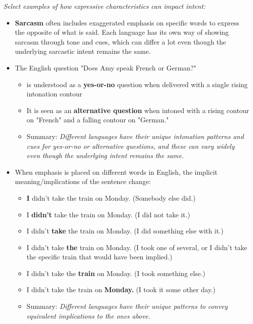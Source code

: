 \begin{boxA}
\textit{Select examples of how expressive characteristics can impact intent:}
\begin{itemize}
    \item \textbf{Sarcasm} often includes exaggerated emphasis on specific words to express the opposite of what is said. Each language has its own way of showing sarcasm through tone and cues, which can differ a lot even though the underlying sarcastic intent remains the same.
    \item The English question "Does Amy speak French or German?"
    \begin{itemize}
        \item is understood as a \textbf{yes-or-no} question when delivered with a single rising intonation contour
        \item It is seen as an \textbf{alternative question} when intoned with a rising contour on "French" and a falling contour on "German."
        \item Summary: \textit{Different languages have their unique intonation patterns and cues for yes-or-no or alternative questions, and these can vary widely even though the underlying intent remains the same.}
    \end{itemize}
    \item When emphasis is placed on different words in English, the implicit meaning/implications of the sentence change:
    \begin{itemize}
        \item \textbf{I} didn't take the train on Monday. (Somebody else did.)
        \item I \textbf{didn't} take the train on Monday. (I did not take it.)
        \item I didn't \textbf{take} the train on Monday. (I did something else with it.)
        \item I didn't take \textbf{the} train on Monday. (I took one of several, or I didn't take the specific train that would have been implied.)
        \item I didn't take the \textbf{train} on Monday. (I took something else.)
        \item I didn't take the train on \textbf{Monday.} (I took it some other day.)
        \item Summary: \textit{Different languages have their unique patterns to convey equivalent implications to the ones above.}
    \end{itemize}
\end{itemize}
\end{boxA}

